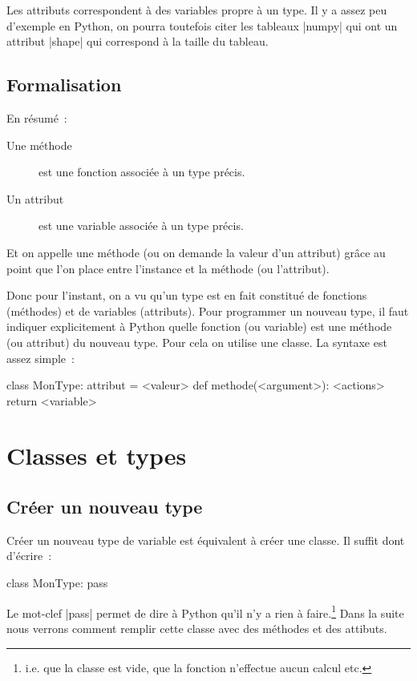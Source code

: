 		Les attributs correspondent à des variables propre à un type. Il y a assez peu d'exemple en Python, on pourra toutefois citer les tableaux \python|numpy| qui ont un attribut \python|shape| qui correspond à la taille du tableau.
		
		\subsection{Formalisation}
		En résumé~:
		\begin{description}
			\item[Une méthode] est une fonction associée à un type précis.
			\item[Un attribut] est une variable associée à un type précis.
		\end{description}
		Et on appelle une méthode (ou on demande la valeur d'un attribut) grâce au point que l'on place entre l'instance et la méthode (ou l'attribut).
		
		Donc pour l'instant, on a vu qu'un type est en fait constitué de fonctions (méthodes) et de variables (attributs). Pour programmer un nouveau type, il faut indiquer explicitement à Python quelle fonction (ou variable) est une méthode (ou attribut) du nouveau type. Pour cela on utilise une classe. La syntaxe est assez simple~:
		\begin{pythoncode}
			class MonType:
				attribut = <valeur>
				def methode(<argument>):
					<actions>
					return <variable>
		\end{pythoncode}

\section{Classes et types}
	
	\subsection{Créer un nouveau type}
		
		Créer un nouveau type de variable est équivalent à créer une classe. Il suffit dont d'écrire~: 
		\begin{pythoncode}
			class MonType:
				pass
		\end{pythoncode}
		Le mot-clef \python|pass| permet de dire à Python qu'il n'y a rien à faire.\footnote{i.e. que la classe est vide, que la fonction n'effectue aucun calcul etc.} Dans la suite nous verrons comment remplir cette classe avec des méthodes et des attibuts.
		
